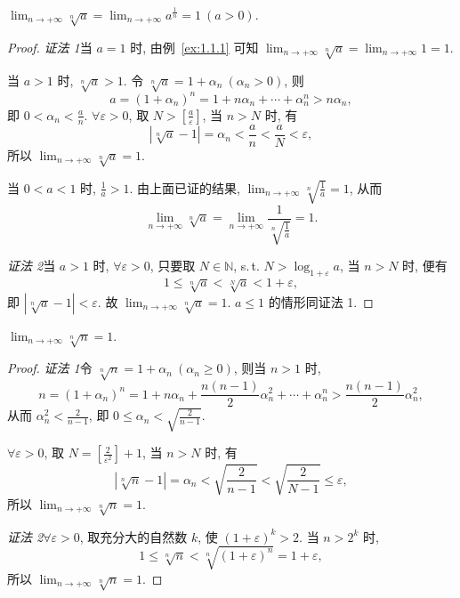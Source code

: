 \begin{example}\label{ex:1.1.6}
$\lim_{n\to+\infty}\sqrt[n]{a}=\lim_{n\to+\infty}a^{\frac{1}{n}}=1\ (a>0)$.
\end{example}
\begin{proof}
\textit{证法 1}\quad 当 $a=1$ 时, 由例~\ref{ex:1.1.1} 可知 $\lim_{n\to+\infty}\sqrt[n]{a}=\lim_{n\to+\infty}1=1$.

当 $a>1$ 时, $\sqrt[n]{a}>1$. 令 $\sqrt[n]{a}=1+\alpha_n\ (\alpha_n>0)$, 则
\[
  a = (1+\alpha_n)^n = 1+n\alpha_n+\cdots+\alpha_n^n > n\alpha_n,
\]
即 $0<\alpha_n<\frac{a}{n}$. $\forall\varepsilon>0$, 取 $N>\left[\frac{a}{\varepsilon}\right]$, 当 $n>N$ 时, 有
\[
  |\sqrt[n]{a}-1| = \alpha_n < \frac{a}{n} < \frac{a}{N} < \varepsilon,
\]
所以 $\lim_{n\to+\infty}\sqrt[n]{a}=1$.

当 $0<a<1$ 时, $\frac{1}{a}>1$. 由上面已证的结果, $\lim_{n\to+\infty}\sqrt[n]{\frac{1}{a}}=1$, 从而
\[
  \lim_{n\to+\infty}\sqrt[n]{a}=\lim_{n\to+\infty}\frac{1}{\sqrt[n]{\frac{1}{a}}}=1.
\]

\textit{证法 2}\quad 当 $a>1$ 时, $\forall\varepsilon>0$, 只要取 $N\in\mathbb{N}$, s.\,t. $N>\log_{1+\varepsilon}a$, 当 $n>N$ 时, 便有
\[
  1 \leqslant \sqrt[n]{a} < \sqrt[N]{a} < 1+\varepsilon,
\]
即 $|\sqrt[n]{a}-1|<\varepsilon$. 故 $\lim_{n\to+\infty}\sqrt[n]{a}=1$. $a\leqslant 1$ 的情形同证法 1.
\end{proof}

\begin{example}\label{ex:1.1.7}
$\lim_{n\to+\infty}\sqrt[n]{n}=1$.
\end{example}
\begin{proof}
\textit{证法 1}\quad 令 $\sqrt[n]{n}=1+\alpha_{n}\ (\alpha_{n}\geqslant0)$, 则当 $n>1$ 时,
\[
  n = (1+\alpha_{n})^{n} = 1+n\alpha_{n}+\frac{n(n-1)}{2}\alpha_{n}^{2}+\cdots+\alpha_{n}^{n} > \frac{n(n-1)}{2}\alpha_{n}^{2},
\]
从而 $\alpha_n^2 < \frac{2}{n-1}$, 即 $0 \leqslant \alpha_n < \sqrt{\frac{2}{n-1}}$.

$\forall\varepsilon>0$, 取 $N = \left[\frac{2}{\varepsilon^2}\right]+1$, 当 $n>N$ 时, 有
\[
  |\sqrt[n]{n}-1| = \alpha_n < \sqrt{\frac{2}{n-1}} < \sqrt{\frac{2}{N-1}} \leqslant \varepsilon,
\]
所以 $\lim_{n\to+\infty}\sqrt[n]{n}=1$.

\textit{证法 2}\quad $\forall\varepsilon>0$, 取充分大的自然数 $k$, 使 $(1+\varepsilon)^k > 2$. 当 $n>2^k$ 时,
\[
  1 \leqslant \sqrt[n]{n} < \sqrt[n]{(1+\varepsilon)^n} = 1+\varepsilon,
\]
所以 $\lim_{n\to+\infty}\sqrt[n]{n}=1$.
\end{proof}

